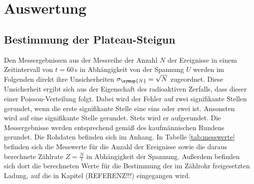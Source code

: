 \section{Auswertung}
\label{sec:Auswertung}

\subsection{Bestimmung der Plateau-Steigun}
\label{subsec:plateau}

Den Messergebnissen aus der Messreihe der Anzahl $N$ der Ereignisse in einem Zeitintervall
von $t=60\,$s in Abhängigkeit von der Spannung $U$ werden im Folgenden direkt ihre
Unsicherheiten $\sigma_{\symup{N}}=\sqrt{N}$ zugeordnet. Diese Unsicherheit ergibt
sich aus der Eigenschaft des radioaktiven Zerfalls, dass dieser einer Poisson-Verteilung
folgt. Dabei wird der Fehler auf zwei signifikante Stellen gerundet, wenn die
erste signifikante Stelle eine eins oder zwei ist. Ansonsten wird auf eine signifikante
Stelle gerundet. Stets wird er aufgerundet. Die Messergebnisse werden entsprechend
gemäß des kaufmännischen Rundens gerundet. Die Rohdaten befinden sich im Anhang.
In Tabelle \ref{tab:messwerte} befinden sich die Messwerte für die Anzahl der
Ereignisse sowie die daraus berechnete Zählrate $Z=\frac{N}{t}$ in Abhängigkeit
der Spannung. Außerdem befinden sich dort die berechneten Werte für die Bestimmung
der im Zählrohr freigesetzten Ladung, auf die in Kapitel (REFERENZ!!!) eingegangen
wird.

